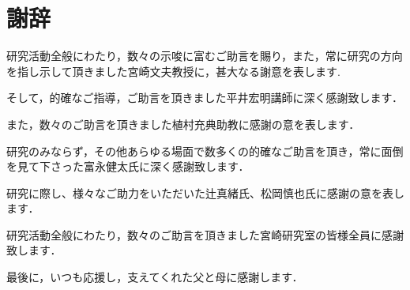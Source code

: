 
\chapter*{謝辞}
研究活動全般にわたり，数々の示唆に富むご助言を賜り，また，常に研究の方向を指し示して頂きました宮崎文夫教授に，甚大なる謝意を表します.

そして，的確なご指導，ご助言を頂きました平井宏明講師に深く感謝致します．

また，数々のご助言を頂きました植村充典助教に感謝の意を表します．

研究のみならず，その他あらゆる場面で数多くの的確なご助言を頂き，常に面倒を見て下さった富永健太氏に深く感謝致します．

研究に際し、様々なご助力をいただいた辻真緒氏、松岡慎也氏に感謝の意を表します．

研究活動全般にわたり，数々のご助言を頂きました宮崎研究室の皆様全員に感謝致します．

最後に，いつも応援し，支えてくれた父と母に感謝します．
